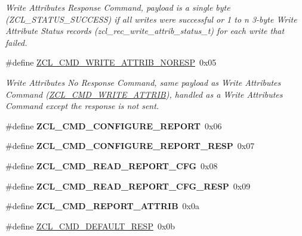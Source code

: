 \begin{DoxyCompactItemize}
\begin{DoxyCompactList}\small\item\em Write Attributes Response Command, payload is a single byte (Z\+C\+L\+\_\+\+S\+T\+A\+T\+U\+S\+\_\+\+S\+U\+C\+C\+E\+SS) if all writes were successful or 1 to n 3-\/byte Write Attribute Status records (zcl\+\_\+rec\+\_\+write\+\_\+attrib\+\_\+status\+\_\+t) for each write that failed. \end{DoxyCompactList}\item 
\#define \hyperlink{group__zcl_ga57091c6a11fbc2680ac63fa262bf74ca}{Z\+C\+L\+\_\+\+C\+M\+D\+\_\+\+W\+R\+I\+T\+E\+\_\+\+A\+T\+T\+R\+I\+B\+\_\+\+N\+O\+R\+E\+SP}~0x05
\begin{DoxyCompactList}\small\item\em Write Attributes No Response Command, same payload as Write Attributes Command (\hyperlink{group__zcl_ga8843c2bcb861c091ae6f9a4e36f7e4d8}{Z\+C\+L\+\_\+\+C\+M\+D\+\_\+\+W\+R\+I\+T\+E\+\_\+\+A\+T\+T\+R\+IB}), handled as a Write Attributes Command except the response is not sent. \end{DoxyCompactList}\item 
\mbox{\label{group__zcl_gab0589ada40dc08b6772b72c1fa091370}} 
\#define {\bfseries Z\+C\+L\+\_\+\+C\+M\+D\+\_\+\+C\+O\+N\+F\+I\+G\+U\+R\+E\+\_\+\+R\+E\+P\+O\+RT}~0x06
\item 
\mbox{\label{group__zcl_ga9def3ca612f14c134aa89e9ae24adc83}} 
\#define {\bfseries Z\+C\+L\+\_\+\+C\+M\+D\+\_\+\+C\+O\+N\+F\+I\+G\+U\+R\+E\+\_\+\+R\+E\+P\+O\+R\+T\+\_\+\+R\+E\+SP}~0x07
\item 
\mbox{\label{group__zcl_gadb61cd667445ad48fc1a6030fe73febb}} 
\#define {\bfseries Z\+C\+L\+\_\+\+C\+M\+D\+\_\+\+R\+E\+A\+D\+\_\+\+R\+E\+P\+O\+R\+T\+\_\+\+C\+FG}~0x08
\item 
\mbox{\label{group__zcl_ga73febefe9cdeeef0f741a7f8ab9644b8}} 
\#define {\bfseries Z\+C\+L\+\_\+\+C\+M\+D\+\_\+\+R\+E\+A\+D\+\_\+\+R\+E\+P\+O\+R\+T\+\_\+\+C\+F\+G\+\_\+\+R\+E\+SP}~0x09
\item 
\mbox{\label{group__zcl_ga23155269324ae4f2a0b8c4978f2cc738}} 
\#define {\bfseries Z\+C\+L\+\_\+\+C\+M\+D\+\_\+\+R\+E\+P\+O\+R\+T\+\_\+\+A\+T\+T\+R\+IB}~0x0a
\item 
\#define \hyperlink{group__zcl_ga92499f538455b8d5a525510fba54adb2}{Z\+C\+L\+\_\+\+C\+M\+D\+\_\+\+D\+E\+F\+A\+U\+L\+T\+\_\+\+R\+E\+SP}~0x0b

\end{DoxyCompactItemize}
